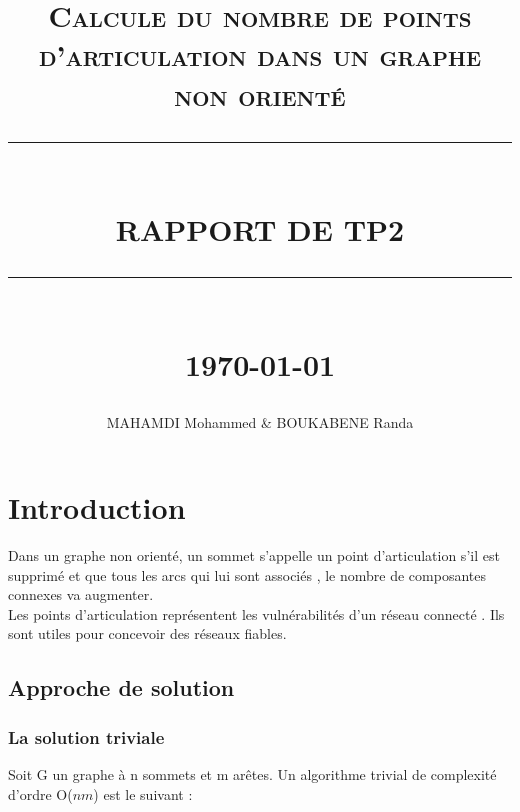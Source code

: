 \documentclass[12pt]{report}
\newcommand{\HRule}[1]{\rule{\linewidth}{#1}}
\begin{document}
	\renewcommand{\contentsname}{Table des Matières}
\renewcommand{\listfigurename}{Table des Figures}

	\author{MAHAMDI Mohammed & BOUKABENE Randa }        
	\date{} 
	\title{  \textsc{ Calcule du nombre de points d'articulation dans un graphe non orienté }
		\\ [2.0cm]
		\HRule{0.5pt} \\
		\LARGE \textbf{\uppercase{Rapport de TP2 }}
		\HRule{2pt} \\ [0.5cm]
		\normalsize \today \vspace*{5\baselineskip}}
	\maketitle
\tableofcontents
\newpage
\listoffigures 
	\newpage
	\sectionfont{\scshape}
	
	\chapter{Introduction}
	 
	Dans un graphe non orienté, un sommet s'appelle un point d'articulation s'il est supprimé et que tous les arcs qui lui sont associés , le nombre de composantes connexes va augmenter.\\
	 Les points d'articulation représentent les vulnérabilités d'un réseau connecté . Ils sont utiles pour concevoir des réseaux fiables.
	\section{Approche de solution}
	\subsection{La solution triviale}
Soit G un graphe à n sommets et m arêtes. Un algorithme trivial de complexité d'ordre O($nm$) est le suivant :
\end{document}
